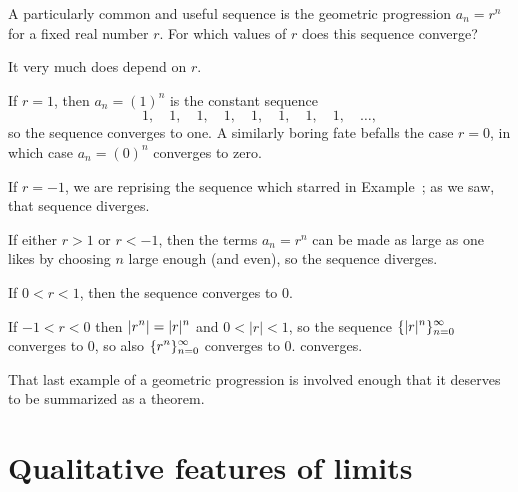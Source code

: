 \begin{example}
A particularly common and useful sequence is the geometric progression $a_n = r^n$
for a fixed real number $r$.  For which values of $r$ does this sequence converge?
\end{example}

\begin{solution}
It very much does depend on $r$.

If $r=1$, then $a_n = (1)^n$ is the constant sequence
$$
1,\quad
1,\quad
1,\quad
1,\quad
1,\quad
1,\quad
1,\quad
1,\quad \ldots,
$$
so the sequence converges to one.  A similarly boring fate befalls the
case $r = 0$, in which case $a_n = (0)^n$ converges to zero.

If $r=-1$, we are reprising the sequence which starred in
Example~; as we saw, that sequence
diverges.

If either $r>1$ or $r<-1$, then the terms $a_n = r^n$ can be made as
large as one likes by choosing $n$ large enough (and even), so the
sequence diverges.

If $0<r<1$, then the sequence converges to 0. 

If $-1<r<0$ then $\displaystyle |r^n|=|r|^n$ and $0<|r|<1$, so the sequence
$\displaystyle \{|r|^n\}_{n=0}^\infty$ converges to 0, so also 
$\displaystyle\{r^n\}_{n=0}^\infty$ converges to 0.
converges.
\end{solution}

That last example of a geometric progression is involved enough that
it deserves to be summarized as a theorem.


\section{Qualitative features of limits}


